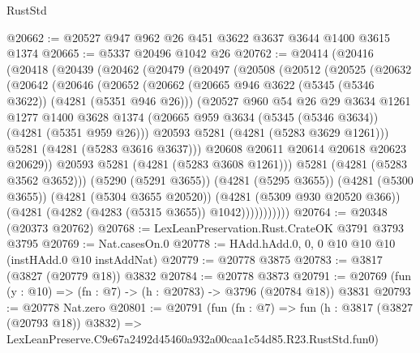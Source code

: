 \begin{lexlean}{RustStd}
\begin{coremodule}
@20662 := @20527 @947 @962 @26 @451 @3622 @3637 @3644 @1400 @3615 @1374
@20665 := @5337 @20496 @1042 @26
@20762 := @20414
    (@20416
      (@20418
        (@20439
          (@20462
            (@20479
              (@20497
                (@20508
                  (@20512
                    (@20525
                      (@20632
                        (@20642
                          (@20646
                            (@20652
                              (@20662
                                (@20665 @946 @3622 (@5345 (@5346 @3622)) (@4281 (@5351 @946 @26)))
                                (@20527
                                  @960
                                  @54
                                  @26
                                  @29
                                  @3634
                                  @1261
                                  @1277
                                  @1400
                                  @3628
                                  @1374
                                  (@20665 @959 @3634 (@5345 (@5346 @3634)) (@4281 (@5351 @959 @26)))
                                  @20593
                                  @5281
                                  (@4281 (@5283 @3629 @1261)))
                                @5281
                                (@4281 (@5283 @3616 @3637)))
                              @20608
                              @20611
                              @20614
                              @20618
                              @20623
                              @20629))
                          @20593
                          @5281
                          (@4281 (@5283 @3608 @1261)))
                        @5281
                        (@4281 (@5283 @3562 @3652)))
                      (@5290 (@5291 @3655))
                      (@4281 (@5295 @3655))
                      (@4281 (@5300 @3655))
                      (@4281 (@5304 @3655 @20520))
                      (@4281 (@5309 @930 @20520 @366))
                      (@4281 (@4282 (@4283 (@5315 @3655)) @1042)))))))))))
@20764 := @20348 (@20373 @20762)
@20768 := LexLeanPreservation.Rust.CrateOK @3791 @3793 @3795
@20769 := Nat.casesOn.{0}
@20778 := HAdd.hAdd.{0, 0, 0} @10 @10 @10 (instHAdd.{0} @10 instAddNat)
@20779 := @20778 @3875
@20783 := @3817 (@3827 (@20779 @18)) @3832
@20784 := @20778 @3873
@20791 := @20769 (fun (y : @10) => (fn : @7) -> (h : @20783) -> @3796 (@20784 @18)) @3831
@20793 := @20778 Nat.zero
@20801 := @20791
    (fun (fn : @7) =>
    fun (h : @3817 (@3827 (@20793 @18)) @3832) =>
    LexLeanPreserve.C9e67a2492d45460a932a00caa1c54d85.R23.RustStd.fun0)

\end{coremodule}
\end{lexlean}
